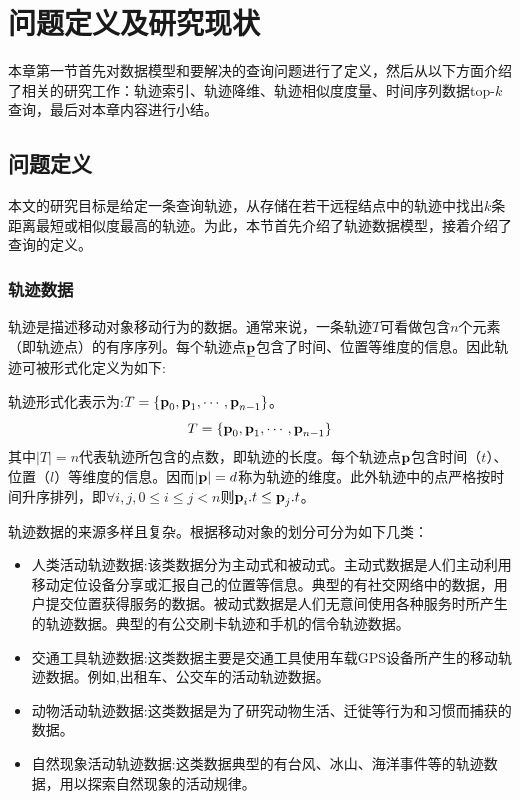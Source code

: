 \chapter{问题定义及研究现状}\label{chapter:relatedwork}
本章第一节首先对数据模型和要解决的查询问题进行了定义，然后从以下方面介绍了相关的研究工作：轨迹索引、轨迹降维、轨迹相似度度量、时间序列数据top-$k$查询，最后对本章内容进行小结。

\section{问题定义}\label{chapter-related-coll}
本文的研究目标是给定一条查询轨迹，从存储在若干远程结点中的轨迹中找出$k$条距离最短或相似度最高的轨迹。为此，本节首先介绍了轨迹数据模型，接着介绍了查询的定义。

\subsection{轨迹数据}
轨迹是描述移动对象移动行为的数据。通常来说，一条轨迹$T$可看做包含$n$个元素（即轨迹点）的有序序列。每个轨迹点$\emph{{\textbf{p}}}$包含了时间、位置等维度的信息。因此轨迹可被形式化定义为如下:
\begin{define}[轨迹]
轨迹形式化表示为:$T=\{\textbf{p}_{0}, \textbf{p}_{1},\cdots, \textbf{p}_{n-1}\}$。
\begin{equation}
T=\{\textbf{p}_{0}, \textbf{p}_{1},\cdots, \textbf{p}_{n-1}\}
\end{equation}
其中$|T|=n$代表轨迹所包含的点数，即轨迹的长度。每个轨迹点$\textbf{p}$包含时间（$t$）、位置（$l$）等维度的信息。因而$|\textbf{p}|=d$称为轨迹的维度。此外轨迹中的点严格按时间升序排列，即$\forall i,j,0\le i\le j < n$则$\textbf{p}_{i}.t \le \textbf{p}_{j}.t$。
\end{define}

轨迹数据的来源多样且复杂。根据移动对象的划分可分为如下几类：
\begin{itemize}
	\item \textsf{人类活动轨迹数据:}该类数据分为主动式和被动式。主动式数据是人们主动利用移动定位设备分享或汇报自己的位置等信息。典型的有社交网络中的数据，用户提交位置获得服务的数据。被动式数据是人们无意间使用各种服务时所产生的轨迹数据。典型的有公交刷卡轨迹和手机的信令轨迹数据。

	\item \textsf{交通工具轨迹数据:}这类数据主要是交通工具使用车载GPS设备所产生的移动轨迹数据。例如,出租车、公交车的活动轨迹数据。
	
	\item \textsf{动物活动轨迹数据:}这类数据是为了研究动物生活、迁徙等行为和习惯而捕获的数据。
	
		\item \textsf{自然现象活动轨迹数据:}这类数据典型的有台风、冰山、海洋事件等的轨迹数据，用以探索自然现象的活动规律。
\end{itemize}

